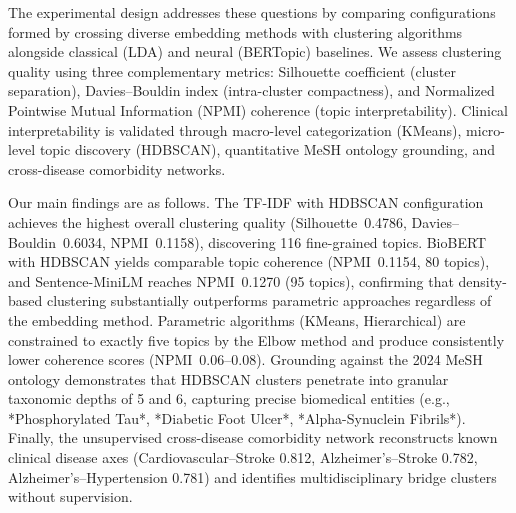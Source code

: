\documentclass[a4paper,10pt,conference]{IEEEtran}
\begin{document}
The experimental design addresses these questions by comparing configurations formed by crossing diverse embedding methods with clustering algorithms alongside classical (LDA) and neural (BERTopic) baselines. We assess clustering quality using three complementary metrics: Silhouette coefficient (cluster separation), Davies--Bouldin index (intra-cluster compactness), and Normalized Pointwise Mutual Information (NPMI) coherence (topic interpretability). Clinical interpretability is validated through macro-level categorization (KMeans), micro-level topic discovery (HDBSCAN), quantitative MeSH ontology grounding, and cross-disease comorbidity networks.

Our main findings are as follows. The TF-IDF with HDBSCAN configuration achieves the highest overall clustering quality (Silhouette~0.4786, Davies--Bouldin~0.6034, NPMI~0.1158), discovering 116 fine-grained topics. BioBERT with HDBSCAN yields comparable topic coherence (NPMI~0.1154, 80 topics), and Sentence-MiniLM reaches NPMI~0.1270 (95 topics), confirming that density-based clustering substantially outperforms parametric approaches regardless of the embedding method. Parametric algorithms (KMeans, Hierarchical) are constrained to exactly five topics by the Elbow method and produce consistently lower coherence scores (NPMI~0.06--0.08). Grounding against the 2024 MeSH ontology demonstrates that HDBSCAN clusters penetrate into granular taxonomic depths of 5 and 6, capturing precise biomedical entities (e.g., *Phosphorylated Tau*, *Diabetic Foot Ulcer*, *Alpha-Synuclein Fibrils*). Finally, the unsupervised cross-disease comorbidity network reconstructs known clinical disease axes (Cardiovascular--Stroke 0.812, Alzheimer's--Stroke 0.782, Alzheimer's--Hypertension 0.781) and identifies multidisciplinary bridge clusters without supervision.
\end{document}

